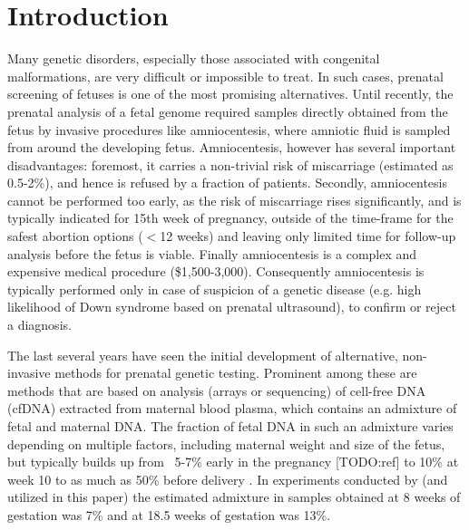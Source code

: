 \section{Introduction}

Many genetic disorders, especially those associated with congenital malformations, are very difficult or impossible to treat. In such cases, prenatal screening of fetuses is one of the most promising alternatives. 
Until recently, the prenatal analysis of a fetal genome required samples directly obtained from the fetus by invasive procedures like amniocentesis, where amniotic fluid is sampled from around the developing fetus.
Amniocentesis, however has several important disadvantages: foremost, it carries a non-trivial risk of miscarriage (estimated as 0.5-2\%), and hence is refused by a fraction of patients. Secondly, amniocentesis cannot be performed too early, as the risk of miscarriage rises significantly, and is typically indicated for 15th week of pregnancy, outside of the time-frame for the safest abortion options ($<$12 weeks) and leaving only limited time for follow-up analysis before the fetus is viable. Finally amniocentesis is a complex and expensive medical procedure (\$1,500-3,000). Consequently amniocentesis is typically performed only in case of suspicion of a genetic disease (e.g. high likelihood of Down syndrome based on prenatal ultrasound), to confirm or reject a diagnosis. 

The last several years have seen the initial development of alternative, non-invasive methods for prenatal genetic testing. Prominent among these are methods that are based on analysis (arrays or sequencing) of  cell-free DNA (cfDNA) extracted from maternal blood plasma, which contains an admixture of fetal and maternal DNA. The fraction of fetal DNA in such an admixture varies depending on multiple factors, including maternal weight and size of the fetus, but typically builds up from ~5-7\% early in the pregnancy [TODO:ref] to 10\% at week 10 \cite{wang2013} to as much as 50\% before delivery \cite{wang2013, fan2012}. In experiments conducted by \cite{kitzman2012} (and utilized in this paper) the estimated admixture in samples obtained at 8 weeks of gestation was 7\% and at 18.5 weeks of gestation was 13\%. 

